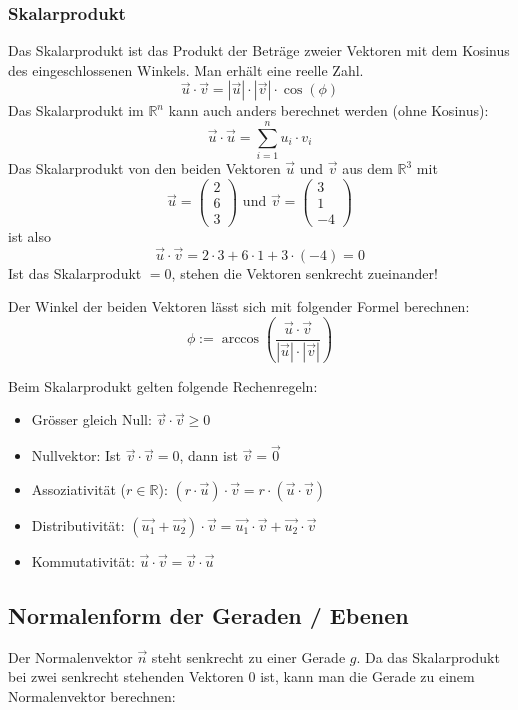 \subsubsection{Skalarprodukt}
Das Skalarprodukt ist das Produkt der Beträge zweier Vektoren mit dem
Kosinus des eingeschlossenen Winkels. Man erhält eine reelle Zahl.
\[ \vec{u} \cdot \vec{v} = |\vec{u}| \cdot |\vec{v}| \cdot \cos{(\phi)} \]
Das Skalarprodukt im $\mathbb{R}^n$ kann auch anders berechnet werden
(ohne Kosinus):
\[ \vec{u} \cdot \vec{u} = \sum \limits_{i = 1}^n u_i \cdot v_i \]
Das Skalarprodukt von den beiden Vektoren $\vec{u}$ und
$\vec{v}$ aus dem $\mathbb{R}^3$ mit
\[ \vec{u} = \left( \begin{array}{c} 2 \\ 6 \\ 3 \end{array}\right)
\text{ und } \vec{v} = \left( \begin{array}{c} 3 \\ 1 \\ -4 \end{array}\right) \]
ist also
\[ \vec{u} \cdot \vec{v} = 2 \cdot 3 + 6 \cdot 1 + 3 \cdot (-4) = 0 \]
Ist das Skalarprodukt $= 0$, stehen die Vektoren senkrecht zueinander!

Der Winkel der beiden Vektoren lässt sich mit folgender Formel
berechnen:
\[ \phi := \arccos{\left(\frac{\vec{u} \cdot \vec{v}}{|\vec{u}| \cdot
|\vec{v}|}\right)} \]


Beim Skalarprodukt gelten folgende Rechenregeln:
\begin{itemize}
  \item Grösser gleich Null: $\vec{v} \cdot \vec{v} \ge 0$
  \item Nullvektor: Ist $\vec{v} \cdot \vec{v} = 0$, dann ist $\vec{v} = \vec{0}$
  \item Assoziativität ($r \in \mathbb{R}$): $(r \cdot \vec{u}) \cdot \vec{v} 
    = r \cdot ( \vec{u} \cdot \vec{v})$
  \item Distributivität: $(\vec{u_1} + \vec{u_2}) \cdot \vec{v} 
    = \vec{u_1} \cdot \vec{v} + \vec{u_2} \cdot \vec{v}$
  \item Kommutativität: $\vec{u} \cdot \vec{v} = \vec{v} \cdot \vec{u}$
\end{itemize}

\subsection{Normalenform der Geraden / Ebenen}
Der Normalenvektor $\vec{n}$ steht senkrecht zu einer Gerade $g$. Da das
Skalarprodukt bei zwei senkrecht stehenden Vektoren $0$ ist, kann man
die Gerade zu einem Normalenvektor berechnen:

